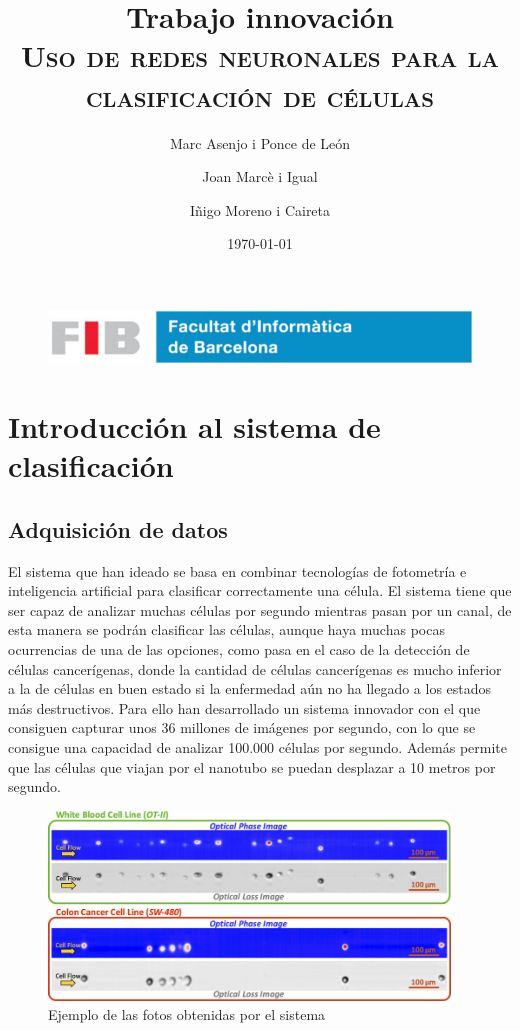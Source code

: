 \documentclass[a4paper, 12pt, UTF8]{article}
\title{
	\Huge
	\textbf{Trabajo innovación} \\
	\scshape Uso de redes neuronales para la clasificación de células
	}
\author{
	Marc Asenjo i Ponce de León \and
	Joan Marcè i Igual \and
	Iñigo Moreno i Caireta
	}
\date{\today}
\begin{document}
\maketitle

\begin{figure}
	\centering
	\includegraphics[width=\linewidth]{./simple_FIB}
\end{figure}

\newpage
\tableofcontents

\newpage
\section{Introducción al sistema de clasificación}

\subsection{Adquisición de datos}
El sistema que han ideado se basa en combinar tecnologías de fotometría e inteligencia artificial para clasificar correctamente una célula. El sistema tiene que ser capaz de analizar muchas células por segundo mientras pasan por un canal, de esta manera se podrán clasificar las células, aunque haya muchas pocas ocurrencias de una de las opciones, como pasa en el caso de la detección de células cancerígenas, donde la cantidad de células cancerígenas es mucho inferior a la de células en buen estado si la enfermedad aún no ha llegado a los estados más destructivos. Para ello han desarrollado un sistema innovador con el que consiguen capturar unos 36 millones de imágenes por segundo, con lo que se consigue una capacidad de analizar 100.000 células por segundo. Además permite que las células que viajan por el nanotubo se puedan desplazar a 10 metros por segundo.

\begin{figure}[h!]
	\centering
	\includegraphics[width=0.95\textwidth]{Phase}
	\caption{Ejemplo de las fotos obtenidas por el sistema}
	\label{fig:phase}
\end{figure}
\end{document}
